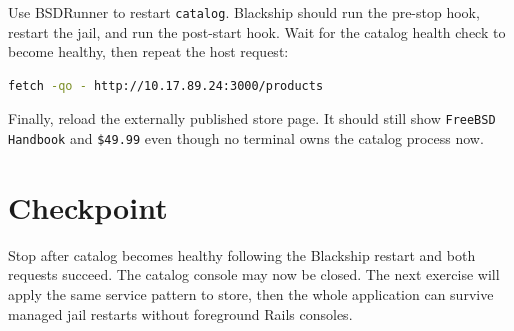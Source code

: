 Use BSDRunner to restart \texttt{catalog}. Blackship should run the pre-stop
hook, restart the jail, and run the post-start hook. Wait for the catalog health
check to become healthy, then repeat the host request:

\begin{lstlisting}[language=sh]
fetch -qo - http://10.17.89.24:3000/products
\end{lstlisting}

Finally, reload the externally published store page. It should still show
\texttt{FreeBSD Handbook} and \texttt{\$49.99} even though no terminal owns the
catalog process now.

\section{Checkpoint}

Stop after catalog becomes healthy following the Blackship restart and both
requests succeed. The catalog console may now be closed. The next exercise will
apply the same service pattern to store, then the whole application can survive
managed jail restarts without foreground Rails consoles.
